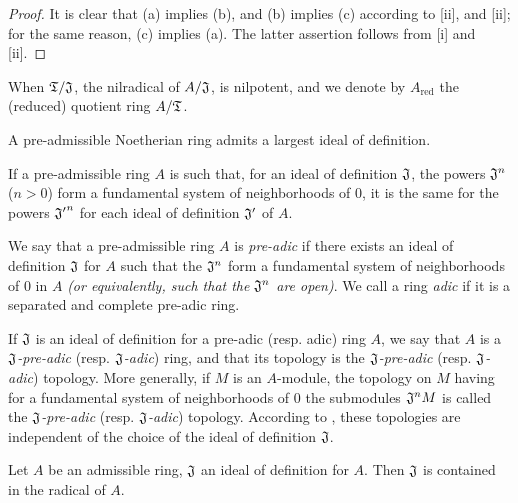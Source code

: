 \begin{proof}
\label{proof-0.7.1.6}
It is clear that (a) implies (b), and (b) implies (c) according to
[ii], and [ii]; for the same
reason, (c) implies (a). The latter assertion follows from [i] and
[ii].
\end{proof}

When $\mathfrak{T}/\mathfrak{J}$, the nilradical of $A/\mathfrak{J}$, is
nilpotent, and we denote by $A_\text{red}$ the (reduced) quotient ring
$A/\mathfrak{T}$.

\begin{cor}[7.1.7]
\label{0.7.1.7}
A pre-admissible Noetherian ring admits a largest ideal of definition.
\end{cor}

\begin{cor}[7.1.8]
\label{0.7.1.8}
If a pre-admissible ring $A$ is such that, for an ideal of definition
$\mathfrak{J}$, the powers $\mathfrak{J}^n$ ($n>0$) form a fundamental system
of neighborhoods of $0$, it is the same for the powers ${\mathfrak{J}'}^n$ for
each ideal of definition $\mathfrak{J}'$ of $A$.
\end{cor}

\begin{defn}[7.1.9]
\label{0.7.1.9}
We say that a pre-admissible ring $A$ is \emph{pre-adic} if there exists an
ideal of definition $\mathfrak{J}$ for $A$ such that the $\mathfrak{J}^n$ form
a fundamental system of neighborhoods of $0$ in $A$ \emph{(or equivalently, such
that the $\mathfrak{J}^n$ are \emph{open})}. We call a ring \emph{adic} if it
is a separated and complete pre-adic ring.
\end{defn}

If $\mathfrak{J}$ is an ideal of definition for a pre-adic (resp. adic) ring
$A$, we say that $A$ is a \emph{$\mathfrak{J}$-pre-adic}
(resp. \emph{$\mathfrak{J}$-adic}) ring, and that its topology is the
\emph{$\mathfrak{J}$-pre-adic} (resp. \emph{$\mathfrak{J}$-adic}) topology. More
generally, if $M$ is an $A$-module, the topology on $M$ having for a fundamental
system of neighborhoods of $0$ the submodules $\mathfrak{J}^n M$ is called the
\emph{$\mathfrak{J}$-pre-adic} (resp. \emph{$\mathfrak{J}$-adic}) topology.
According to , these topologies are independent of the choice
of the ideal of definition $\mathfrak{J}$.

\begin{prop}[7.1.10]
\label{0.7.1.10}
Let $A$ be an admissible ring, $\mathfrak{J}$ an ideal of definition for $A$.
Then $\mathfrak{J}$ is contained in the radical of $A$.
\end{prop}

